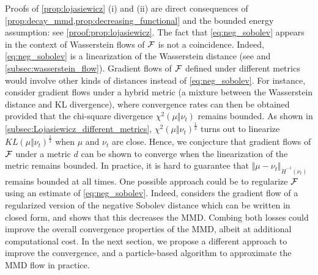 Proofs of \cref{prop:lojasiewicz}  (i) and (ii)  are direct consequences of \cref{prop:decay_mmd,prop:decreasing_functional} and the bounded energy assumption: see  \cref{proof:prop:lojasiewicz}. The fact that \cref{eq:neg_sobolev} appears in the context of Wasserstein flows of ${{\mathcal F}}$ is not a coincidence. Indeed, \cref{eq:neg_sobolev} is a linearization of the Wasserstein distance (see \cite{Peyre:2011,Otto:2000} and \cref{subsec:wasserstein_flow}). Gradient flows of ${{\mathcal F}}$ defined under different metrics would involve other kinds of distances instead of \cref{eq:neg_sobolev}. 
For instance, \cite{rotskoff2019global} consider gradient flows under a hybrid metric (a mixture between the Wasserstein distance and KL divergence), where convergence rates can then be obtained provided that the chi-square divergence $\chi^2(\mu\Vert \nu_t)$ remains bounded. As shown in \cref{subsec:Lojasiewicz_different_metrics}, $\chi^2(\mu\Vert \nu_t)^{\frac{1}{2}}$ turns out to linearize $KL(\mu\Vert \nu_t)^{\frac{1}{2}}$ when $\mu$ and $\nu_t$ are close. Hence, we conjecture that gradient flows of ${{\mathcal F}}$ under a metric $d$ can be shown to converge when the linearization of the metric remains bounded. 
In practice, it is hard to guarantee that $\Vert \mu - \nu_t \Vert_{\dot{H}^{-1}(\nu_t)} $ remains bounded at all times. One possible approach could be to regularize ${{\mathcal F}}$ using an estimate of \cref{eq:neg_sobolev}. Indeed, \cite{Mroueh:2019} considers the gradient flow of a regularized version of the negative Sobolev distance which can be written in closed form, and shows that this decreases the MMD. Combing both losses could improve the overall convergence properties of the MMD, albeit at additional computational cost. In the next section, we propose a different approach to improve the convergence, and a particle-based algorithm to approximate the MMD flow in practice.
